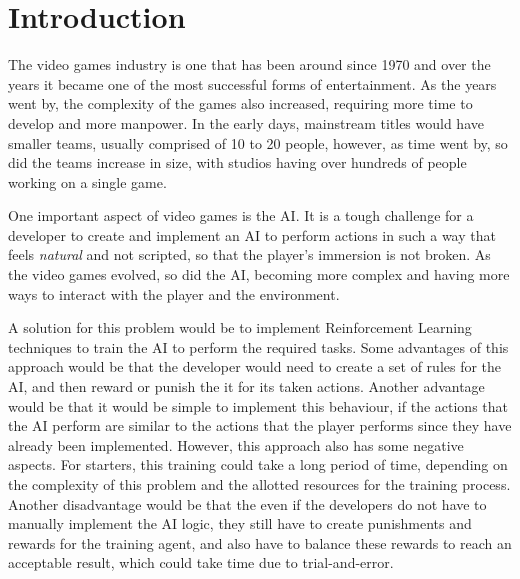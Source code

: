\chapter{Introduction}

The video games industry is one that has been around since 1970 and over the years it became one of the most successful forms of entertainment. As the years went by, the complexity of the games also increased, requiring more time to develop and more manpower. In the early days, mainstream titles would have smaller teams, usually comprised of 10 to 20 people, however, as time went by, so did the teams increase in size, with studios having over hundreds of people working on a single game.

One important aspect of video games is the AI. It is a tough challenge for a developer to create and implement an AI to perform actions in such a way that feels \emph{natural} and not scripted, so that the player's immersion is not broken. As the video games evolved, so did the AI, becoming more complex and having more ways to interact with the player and the environment.

A solution for this problem would be to implement Reinforcement Learning techniques to train the AI to perform the required tasks. Some advantages of this approach would be that the developer would need to create a set of rules for the AI, and then reward or punish the it for its taken actions. Another advantage would be that it would be simple to implement this behaviour, if the actions that the AI perform are similar to the actions that the player performs since they have already been implemented. However, this approach also has some negative aspects. For starters, this training could take a long period of time, depending on the complexity of this problem and the allotted resources for the training process. Another disadvantage would be that the even if the developers do not have to manually implement the AI logic, they still have to create punishments and rewards for the training agent, and also have to balance these rewards to reach an acceptable result, which could take time due to trial-and-error.

%
